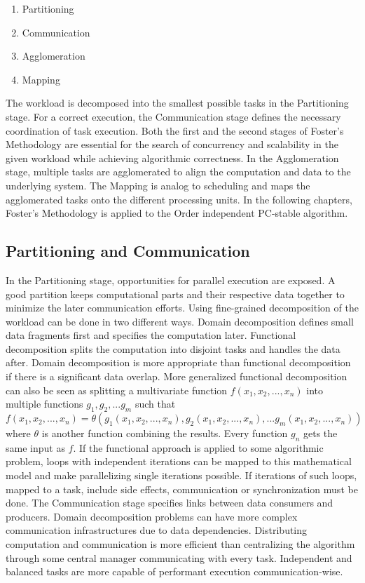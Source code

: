 \begin{enumerate}
    \item Partitioning
    \item Communication
    \item Agglomeration 
    \item Mapping
\end{enumerate}

The workload is decomposed into the smallest possible tasks in the Partitioning stage. For a correct execution, the Communication stage defines the necessary coordination of task execution. Both the first and the second stages of Foster's Methodology are essential for the search of concurrency and scalability in the given workload while achieving algorithmic correctness. In the Agglomeration stage, multiple tasks are agglomerated to align the computation and data to the underlying system. The Mapping is analog to scheduling and maps the agglomerated tasks onto the different processing units. In the following chapters, Foster's Methodology is applied to the Order independent PC-stable algorithm.

\subsection{Partitioning and Communication}
In the Partitioning stage, opportunities for parallel execution are exposed. A good partition keeps computational parts and their respective data together to minimize the later communication efforts. Using fine-grained decomposition of the workload can be done in two different ways. Domain decomposition defines small data fragments first and specifies the computation later. Functional decomposition splits the computation into disjoint tasks and handles the data after. Domain decomposition is more appropriate than functional decomposition if there is a significant data overlap.
More generalized functional decomposition can also be seen as splitting a multivariate function $f(x_1,x_2,...,x_n)$ into multiple functions ${g_1,g_2,...g_m}$ such that $f(x_1,x_2,...,x_n) = \theta(g_1(x_1,x_2,...,x_n),g_2(x_1,x_2,...,x_n),...g_m(x_1,x_2,...,x_n))$ where $\theta$ is another function combining the results. Every function $g_n$ gets the same input as $f$. If the functional approach is applied to some algorithmic problem, loops with independent iterations can be mapped to this mathematical model and make parallelizing single iterations possible. If iterations of such loops, mapped to a task, include side effects, communication or synchronization must be done.
The Communication stage specifies links between data consumers and producers. Domain decomposition problems can have more complex communication infrastructures due to data dependencies. Distributing computation and communication is more efficient than centralizing the algorithm through some central manager communicating with every task. Independent and balanced tasks are more capable of performant execution communication-wise.

